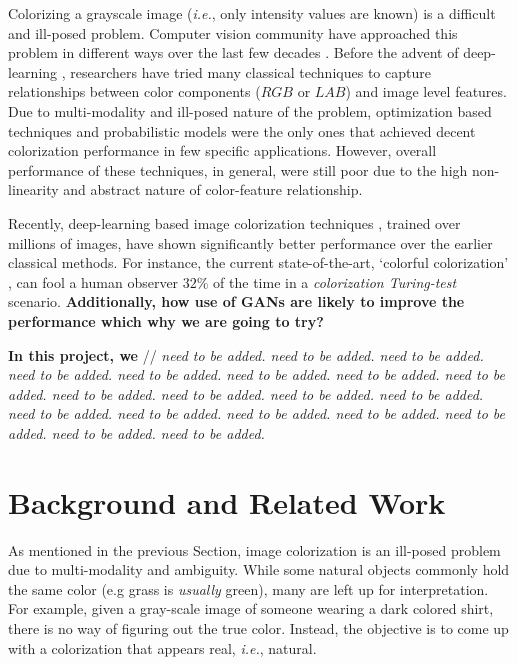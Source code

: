 \documentclass{article} %
\begin{document}
Colorizing a grayscale image (\textit{i.e.}, only intensity values are known) is a difficult and ill-posed problem. Computer vision community have approached this problem in different ways over the last few decades \cite{zhang2016colorful, cheng2015deep, bugeau2014variational, charpiat2008automatic, luan2007natural, konushin2006interactive}. Before the advent of deep-learning \cite{lecun2015deep}, researchers have tried many classical techniques \cite{charpiat2008automatic, luan2007natural, konushin2006interactive, levin2004colorization, lagodzinski2008digital} to capture relationships between color components ($RGB$ or $LAB$) and image level features. 
Due to multi-modality and ill-posed nature of the problem, optimization based techniques \cite{levin2004colorization, charpiat2008automatic} and probabilistic models \cite{lagodzinski2008digital} were the only ones that achieved decent colorization performance in few specific applications. 
However, overall performance of these techniques, in general, were still poor due to the high non-linearity and abstract nature of color-feature relationship.  

Recently, deep-learning based image colorization techniques \cite{zhang2016colorful, cheng2015deep, varga2016fully, li2017watergan}, trained over millions of images, have shown significantly better performance over the earlier classical methods. For instance, the current state-of-the-art, `colorful colorization' \cite{zhang2016colorful}, can fool a human observer $32\%$ of the time in a \textit{colorization Turing-test} scenario. \textbf{Additionally,  how use of GANs are likely to improve the performance which why we are going to try?}

\textbf{In this project, we } 
// \textit{need to be added. need to be added. need to be added. need to be added. need to be added. need to be added. need to be added. need to be added.
need to be added. need to be added. need to be added. need to be added. need to be added. need to be added.
need to be added. need to be added. need to be added. need to be added. need to be added.}

\section{Background and Related Work}\label{sec:back}
As mentioned in the previous Section, image colorization is an ill-posed problem due to multi-modality and ambiguity. 
While some natural objects commonly hold the same color (e.g grass is \textit{usually} green), many are left up for interpretation. 
For example, given a gray-scale image of someone wearing a dark colored shirt, 
there is no way of figuring out the true color. 
Instead, the objective is to come up with a colorization that appears real, \textit{i.e.}, natural. 
\end{document}
